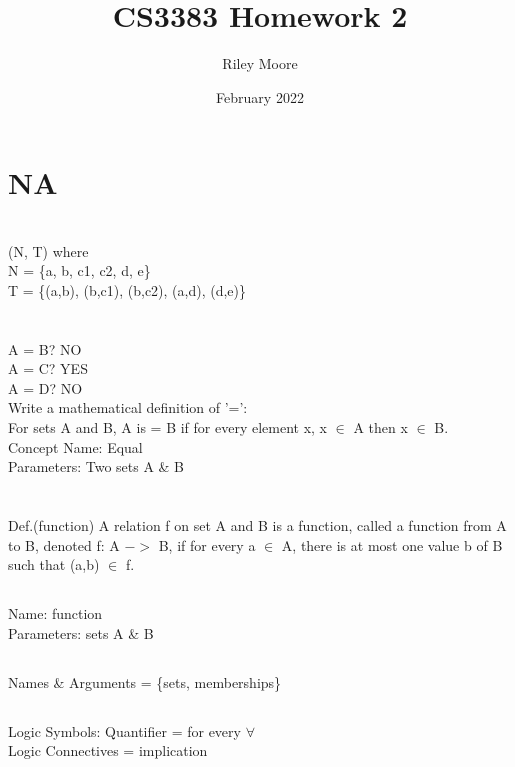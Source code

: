\documentclass{article}
\title{CS3383 Homework 2}
\author{Riley Moore}
\date{February 2022}
\begin{document}
\maketitle

\section{NA}

\section{}
(N, T) where\\
N = \{a, b, c1, c2, d, e\} \\    
T = \{(a,b), (b,c1), (b,c2), (a,d), (d,e)\}

\section{\normalfont}
A = B? NO\\
A = C? YES\\
A = D? NO\\
Write a mathematical definition of '=':\\
For sets A and B, A is = B if for every element x, x $\in$  A then  x $\in$ B.\\
Concept Name: Equal\\
Parameters: Two sets A \& B


\section{}


\section{}
Def.(function) A relation f on set A and B is a function, called a function from A to B, denoted f: A $->$ B, if for every a $\in$ A, there is at most one value b of B such that (a,b) $\in$ f.
\subsection{}
Name: function \\
Parameters: sets A \& B
\subsection{}
Names \& Arguments = \{sets, memberships\}
\subsection{}
Logic Symbols: Quantifier = for every $\forall$ \\
               Logic Connectives = implication
\end{document}
